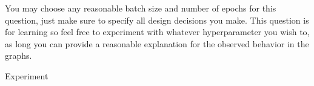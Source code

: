 \begin{enumerate}
     You may choose any reasonable batch size and number of epochs for this question, just make sure to specify all design decisions you make. This question is for learning so feel free to experiment with whatever hyperparameter you wish to, as long you can provide a reasonable explanation for the observed behavior in the graphs.
    
    \begin{tcolorbox}[fit,height=10cm, width=0.95\textwidth, blank, borderline={1pt}{-2pt}]
    Experiment %
    \end{tcolorbox}
\end{enumerate}